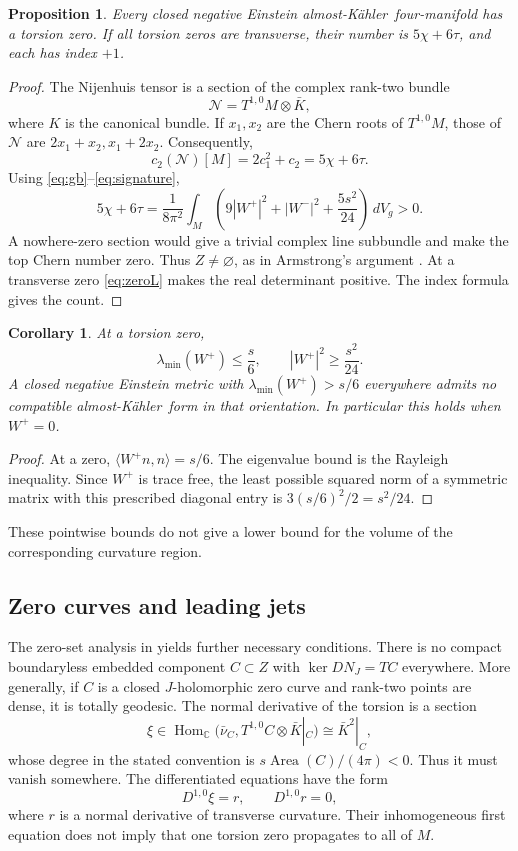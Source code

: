 \documentclass[11pt,a4paper]{article}
\newtheorem{proposition}[theorem]{Proposition}
\newtheorem{corollary}[theorem]{Corollary}
\theoremstyle{definition}
\theoremstyle{remark}
\newcommand{\dd}{\,dV_g}
\newcommand{\C}{\mathbb C}
\newcommand{\cN}{\mathcal N}
\newcommand{\AK}{almost-K\"ahler}
\begin{document}
\begin{proposition}\label{prop:zeroexist}
Every closed negative Einstein \AK\ four-manifold has a torsion zero. If all torsion zeros are transverse, their number is $5\chi+6\tau$, and each has index $+1$.
\end{proposition}
\begin{proof}
The Nijenhuis tensor is a section of the complex rank-two bundle
\[
 \cN=T^{1,0}M\otimes\bar K,
\]
where $K$ is the canonical bundle. If $x_1,x_2$ are the Chern roots of $T^{1,0}M$, those of $\cN$ are $2x_1+x_2,x_1+2x_2$. Consequently,
\[
 c_2(\cN)[M]=2c_1^2+c_2=5\chi+6\tau.
\]
Using \eqref{eq:gb}--\eqref{eq:signature},
\[
 5\chi+6\tau=\frac1{8\pi^2}\int_M
 \left(9|W^+|^2+|W^-|^2+\frac{5s^2}{24}\right)\dd>0.
\]
A nowhere-zero section would give a trivial complex line subbundle and make the top Chern number zero. Thus $Z\ne\varnothing$, as in Armstrong's argument \cite{ArmstrongThesis}. At a transverse zero \eqref{eq:zeroL} makes the real determinant positive. The index formula gives the count.
\end{proof}

\begin{corollary}\label{cor:curvaturezero}
At a torsion zero,
\[
 \lambda_{\min}(W^+)\le\frac s6,\qquad |W^+|^2\ge\frac{s^2}{24}.
\]
A closed negative Einstein metric with $\lambda_{\min}(W^+)>s/6$ everywhere admits no compatible \AK\ form in that orientation. In particular this holds when $W^+=0$.
\end{corollary}
\begin{proof}
At a zero, $\langle W^+n,n\rangle=s/6$. The eigenvalue bound is the Rayleigh inequality. Since $W^+$ is trace free, the least possible squared norm of a symmetric matrix with this prescribed diagonal entry is $3(s/6)^2/2=s^2/24$.
\end{proof}
These pointwise bounds do not give a lower bound for the volume of the corresponding curvature region.

\subsection{Zero curves and leading jets}
The zero-set analysis in \cite{ZeroCurves} yields further necessary conditions. There is no compact boundaryless embedded component $C\subset Z$ with $\ker DN_J=TC$ everywhere. More generally, if $C$ is a closed $J$-holomorphic zero curve and rank-two points are dense, it is totally geodesic. The normal derivative of the torsion is a section
\[
 \xi\in\operatorname{Hom}_{\C}(\bar\nu_C,T^{1,0}C\otimes\bar K|_C)
 \cong\bar K^2|_C,
\]
whose degree in the stated convention is $s\operatorname{Area}(C)/(4\pi)<0$. Thus it must vanish somewhere. The differentiated equations have the form
\[
 D^{1,0}\xi=r,\qquad D^{1,0}r=0,
\]
where $r$ is a normal derivative of transverse curvature. Their inhomogeneous first equation does not imply that one torsion zero propagates to all of $M$.
\end{document}
